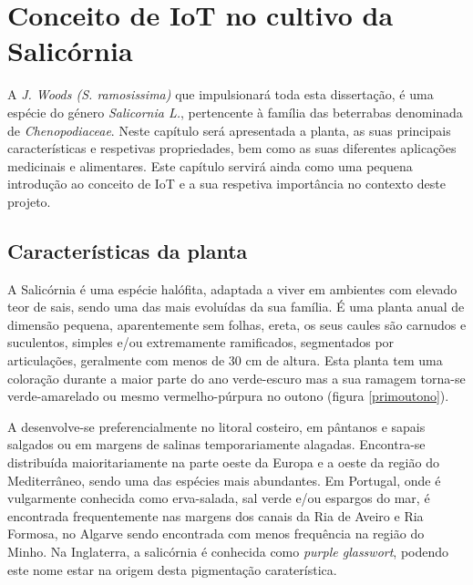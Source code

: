 
\chapter{Conceito de IoT no cultivo da Salicórnia}

 A \sr \space \textit{J. Woods (S. ramosissima)}\cite{JoaoSilva} que impulsionará toda esta dissertação, é uma espécie do género \textit{Salicornia L.}, pertencente à família das beterrabas denominada de \textit{Chenopodiaceae}\cite{chenopodiaceae}.  Neste capítulo será apresentada a planta, as suas principais características e respetivas propriedades, bem como as suas diferentes aplicações medicinais e alimentares. Este capítulo servirá ainda como uma pequena introdução ao conceito de \ac{IoT} e a sua respetiva importância no contexto deste projeto.


\section{Características da planta}


A Salicórnia é uma espécie halófita, adaptada a viver em ambientes com elevado teor de sais\cite{ferri}, sendo uma das mais evoluídas da sua família. É uma planta anual de dimensão pequena, aparentemente sem folhas, ereta, os seus caules são carnudos e suculentos, simples e/ou extremamente ramificados, segmentados por articulações\cite{Silva2000}, geralmente com menos de 30 cm de altura\cite{overviewsal}. Esta planta tem uma coloração durante a maior parte do ano verde-escuro mas a sua ramagem torna-se  verde-amarelado ou mesmo vermelho-púrpura no outono\cite{Silva2000} (figura \ref{primoutono}).




A \sr \space desenvolve-se preferencialmente no litoral costeiro, em pântanos e sapais salgados ou em margens de salinas temporariamente alagadas. Encontra-se distribuída maioritariamente na parte oeste da Europa e a oeste da região do Mediterrâneo, sendo uma das espécies mais abundantes\cite{Figueroa1987}. Em Portugal, onde é vulgarmente conhecida como erva-salada, sal verde e/ou espargos do mar\cite{RaquelPinto}, é encontrada frequentemente nas margens dos canais da Ria de Aveiro e Ria Formosa, no Algarve\cite{RaquelPinto} sendo encontrada com menos frequência na região do Minho\cite{Silva2000}. 
Na Inglaterra, a salicórnia é conhecida como \textit{purple glasswort}, podendo este nome estar na origem desta pigmentação caraterística\cite{Davy2001}. 


